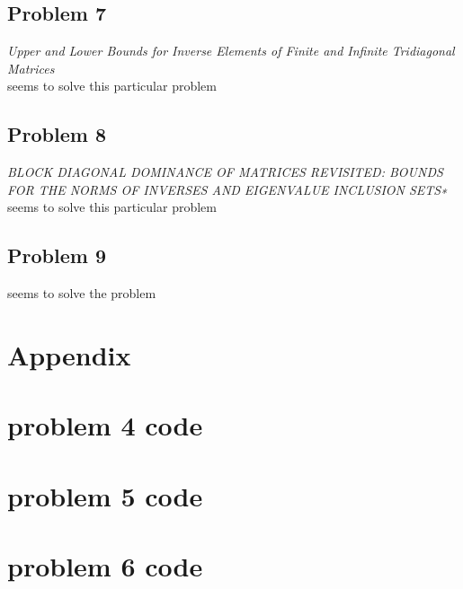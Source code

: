 \documentclass[11pt]{article}
\begin{document}
\subsection*{Problem 7}

\textit{Upper and Lower Bounds for Inverse Elements of Finite and Infinite Tridiagonal Matrices} \\
 seems to solve this particular problem

\subsection*{Problem 8}
\textit{BLOCK DIAGONAL DOMINANCE OF MATRICES REVISITED: BOUNDS FOR THE NORMS OF INVERSES AND EIGENVALUE INCLUSION SETS∗}
 seems to solve this particular problem

\subsection*{Problem 9}
 seems to solve the problem

\newpage

\section*{Appendix}

\section*{problem 4 code}
\label{q4code}


\newpage
\section*{problem 5 code}
\label{q5code}


\newpage
\section*{problem 6 code}
\label{q6code}



 
\end{document}
